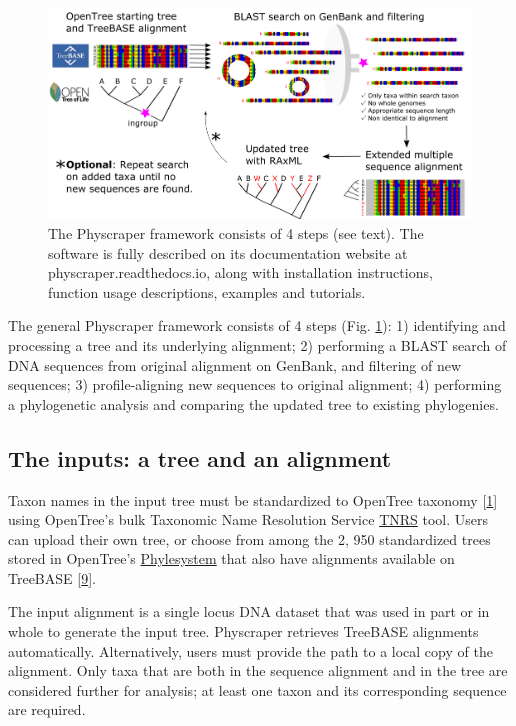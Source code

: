\documentclass[]{article}
\begin{document}
\begin{figure}

{\centering \includegraphics[width=0.85\linewidth]{../docs/figs/schematic-4} 

}

\caption{The Physcraper framework consists of 4 steps (see text). The software is fully described on its documentation website at physcraper.readthedocs.io, along with installation instructions, function usage descriptions, examples and tutorials.}\label{fig:framework}
\end{figure}

The general Physcraper framework consists of 4 steps (Fig. \ref{fig:framework}): 1) identifying and processing a tree and its underlying alignment; 2) performing a BLAST search of DNA sequences from original alignment on GenBank, and filtering of new sequences; 3) profile-aligning new sequences to original alignment; 4) performing a phylogenetic analysis and comparing the updated tree to existing phylogenies.

\hypertarget{the-inputs-a-tree-and-an-alignment}{%
\subsection{The inputs: a tree and an alignment}\label{the-inputs-a-tree-and-an-alignment}}

Taxon names in the input tree must be standardized to OpenTree taxonomy {[}\protect\hyperlink{ref-rees2017automated}{1}{]} using OpenTree's bulk Taxonomic Name Resolution Service \href{https://tree.opentreeoflife.org/curator/tnrs/}{TNRS} tool. Users can upload their own tree, or choose from among the 2, 950 standardized trees stored in OpenTree's \href{https://github.com/opentreeoflife/phylesystem}{Phylesystem} that also have alignments available on TreeBASE {[}\protect\hyperlink{ref-piel2009treebase}{9}{]}.

The input alignment is a single locus DNA dataset that was used in part or in whole to generate the input tree. Physcraper retrieves TreeBASE alignments automatically. Alternatively, users must provide the path to a local copy of the alignment.
Only taxa that are both in the sequence alignment and in the tree are considered further for analysis; at least one taxon and its corresponding sequence are required.
\end{document}
